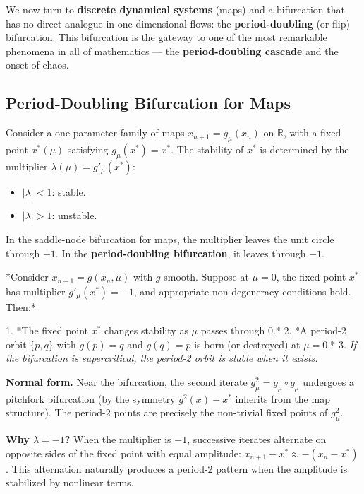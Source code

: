 We now turn to \textbf{discrete dynamical systems} (maps) and a bifurcation that has no direct analogue in one-dimensional flows: the \textbf{period-doubling} (or flip) bifurcation. This bifurcation is the gateway to one of the most remarkable phenomena in all of mathematics --- the \textbf{period-doubling cascade} and the onset of chaos.

\subsection{Period-Doubling Bifurcation for Maps}\label{sec:5.5.1}

Consider a one-parameter family of maps $x_{n+1} = g_\mu(x_n)$ on $\mathbb{R}$, with a fixed point $x^*(\mu)$ satisfying $g_\mu(x^*) = x^*$. The stability of $x^*$ is determined by the multiplier $\lambda(\mu) = g'_\mu(x^*)$:

\begin{itemize}[nosep]
  \item $|\lambda| < 1$: stable.
  \item $|\lambda| > 1$: unstable.
\end{itemize}

In the saddle-node bifurcation for maps, the multiplier leaves the unit circle through $+1$. In the \textbf{period-doubling bifurcation}, it leaves through $-1$.

\begin{theorem}\label{thm:5.7}
*Consider $x_{n+1} = g(x_n, \mu)$ with $g$ smooth. Suppose at $\mu = 0$, the fixed point $x^*$ has multiplier $g'_\mu(x^*) = -1$, and appropriate non-degeneracy conditions hold. Then:*

1. *The fixed point $x^*$ changes stability as $\mu$ passes through $0$.*
2. *A period-2 orbit $\{p, q\}$ with $g(p) = q$ and $g(q) = p$ is born (or destroyed) at $\mu = 0$.*
3. \textit{If the bifurcation is supercritical, the period-2 orbit is stable when it exists.}

\textbf{Normal form.} Near the bifurcation, the second iterate $g^2_\mu = g_\mu \circ g_\mu$ undergoes a pitchfork bifurcation (by the symmetry $g^2(x) - x^*$ inherits from the map structure). The period-2 points are precisely the non-trivial fixed points of $g^2_\mu$.

\textbf{Why $\lambda = -1$?} When the multiplier is $-1$, successive iterates alternate on opposite sides of the fixed point with equal amplitude: $x_{n+1} - x^* \approx -(x_n - x^*)$. This alternation naturally produces a period-2 pattern when the amplitude is stabilized by nonlinear terms.
\end{theorem}


